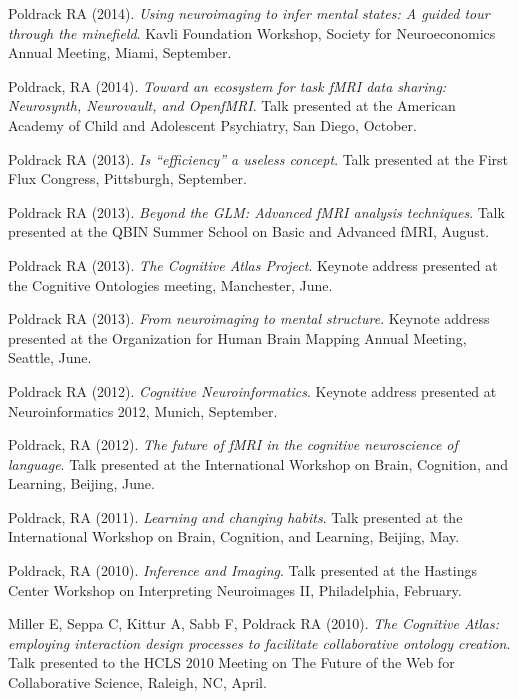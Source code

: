 Poldrack RA (2014). \emph{Using neuroimaging to infer mental states: A guided tour through the minefield}. Kavli Foundation Workshop, Society for Neuroeconomics Annual Meeting, Miami, September. \vspace{2mm} 

Poldrack, RA (2014). \emph{Toward an ecosystem for task fMRI data sharing: Neurosynth, Neurovault, and OpenfMRI}. Talk presented at the American Academy of Child and Adolescent Psychiatry, San Diego, October. \vspace{2mm} 

Poldrack RA (2013). \emph{Is ``efficiency'' a useless concept}. Talk presented at the First Flux Congress, Pittsburgh, September. \vspace{2mm} 

Poldrack RA (2013). \emph{Beyond the GLM: Advanced fMRI analysis techniques}. Talk presented at the QBIN Summer School on Basic and Advanced fMRI, August. \vspace{2mm} 

Poldrack RA (2013). \emph{The Cognitive Atlas Project}. Keynote address presented at the Cognitive Ontologies meeting, Manchester, June. \vspace{2mm} 

Poldrack RA (2013). \emph{From neuroimaging to mental structure}. Keynote address presented at the Organization for Human Brain Mapping Annual Meeting, Seattle, June. \vspace{2mm} 

Poldrack RA (2012). \emph{Cognitive Neuroinformatics}. Keynote address presented at Neuroinformatics 2012, Munich, September. \vspace{2mm} 

Poldrack, RA (2012). \emph{The future of fMRI in the cognitive neuroscience of language}. Talk presented at the International Workshop on Brain, Cognition, and Learning, Beijing, June. \vspace{2mm} 

Poldrack, RA (2011). \emph{Learning and changing habits}. Talk presented at the International Workshop on Brain, Cognition, and Learning, Beijing, May. \vspace{2mm} 

Poldrack, RA (2010). \emph{Inference and Imaging}. Talk presented at the Hastings Center Workshop on Interpreting Neuroimages II, Philadelphia, February. \vspace{2mm} 

Miller E, Seppa C, Kittur A, Sabb F,  Poldrack RA (2010). \emph{The Cognitive Atlas: employing interaction design processes to facilitate collaborative ontology creation}. Talk presented to the HCLS 2010 Meeting on The Future of the Web for Collaborative Science, Raleigh, NC, April. \vspace{2mm} 

